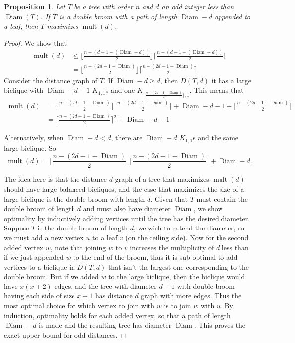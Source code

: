 \documentclass[12]{article}
\DeclareMathOperator{\diam}{Diam}
\DeclareMathOperator{\mult}{mult}
\newtheorem{prop}[thm]{Proposition}
\theoremstyle{definition}
\begin{document}
	\begin{prop}
		Let $T$ be a tree with order $n$ and $d$ an odd integer less than $\diam(T)$.  If $T$ is a double broom with a path of length $\diam - d$ appended to a leaf, then $T$ maximizes $\mult(d)$.
	\end{prop}
	\begin{proof}
		We show that 
		\begin{align*}
			\mult(d) &\leq \biggr\lfloor{\frac{n-(d-1-(\diam-d))}{2}}\biggr\rfloor \biggr\lceil{\frac{n-(d-1-(\diam-d))}{2}}\biggr\rceil 	\\
			&= \biggr\lfloor{\frac{n-(2d-1-\diam)}{2}}\biggr\rfloor \biggr\lceil{\frac{n-(2d-1-\diam)}{2}} \biggr\rceil
		\end{align*}
		Consider the distance graph of $T$.  If $\diam - d \geq d$, then $D(T,d)$ it has a large biclique with $\diam -d-1$ $K_{1,1}$s and one $K_{\lceil{\frac{n-(2d-1-\diam)}{2}}\rceil, 1}$.  This means that
		\begin{align*}
			\mult(d) &= \lfloor{\frac{n-(2d-1-\diam)}{2}}\rfloor \lceil{\frac{n-(2d-1-\diam)}{2}} \rceil + \diam-d-1 + \lceil{\frac{n-(2d-1-\diam)}{2}}\rceil	\\
			&= \Big\lceil{\frac{n-(2d-1-\diam)}{2}} \Big\rceil^2 + \diam-d-1
		\end{align*}
		
		Alternatively, when $\diam - d < d$, there are $\diam-d$ $K_{1,1}$s and the same large biclique.  So
		$$\mult(d) = \Big\lfloor{\frac{n-(2d-1-\diam)}{2}}\Big\rfloor \Big\lceil{\frac{n-(2d-1-\diam)}{2}} \Big \rceil + \diam-d.$$
		
		The idea here is that the distance $d$ graph of a tree that maximizes $\mult(d)$ should have large balanced bicliques, and the case that maximizes the size of a large biclique is the double broom with length $d$.  Given that $T$ must contain the double broom of length $d$ and must also have diameter $\diam$, we show optimality by inductively adding vertices until the tree has the desired diameter.  Suppose $T$ is the double broom of length $d$, we wish to extend the diameter, so we must add a new vertex $u$ to a leaf $v$ (on the ceiling side).  Now for the second added vertex $w$, note that joining $w$ to $v$ increases the multiplicity of $d$ less than if we just appended $w$ to the end of the broom, thus it is sub-optimal to add vertices to a biclique in $D(T,d)$ that isn't the largest one corresponding to the double broom.  But if we added $w$ to the large biclique, then the biclique would have $x(x+2)$ edges, and the tree with diameter $d+1$ with double broom having each side of size $x+1$ has distance $d$ graph with more edges.  Thus the most optimal choice for which vertex to join with $w$ is to join $w$ with $u$.  By induction, optimality holds for each added vertex, so that a path of length $\diam - d$ is made and the resulting tree has diameter $\diam$.  This proves the exact upper bound for odd distances.
	\end{proof}
	
\end{document}
